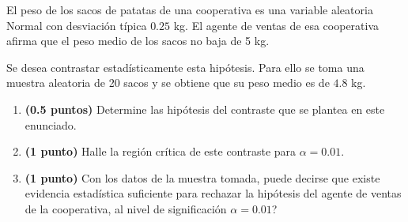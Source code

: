 
El peso de los sacos de patatas de una cooperativa es una variable aleatoria Normal con desviación típica $0.25$ kg. El agente de ventas de esa cooperativa afirma que el peso medio de los sacos no baja de 5 kg.

Se desea contrastar estadísticamente esta hipótesis. Para ello se toma una muestra aleatoria de 20 sacos y se obtiene que su peso medio es de $4.8$ kg.
\begin{enumerate}[label=\alph*)]
\item \textbf{(0.5 puntos)} Determine las hipótesis del contraste que se plantea en este enunciado.
\item \textbf{(1 punto)} Halle la región crítica de este contraste para $\alpha=0.01$.
\item \textbf{(1 punto)} Con los datos de la muestra tomada, \textquestiondown{}puede decirse que existe evidencia estadística suficiente para rechazar la hipótesis del agente de ventas de la cooperativa, al nivel de significación $\alpha=0.01$?
\end{enumerate}
